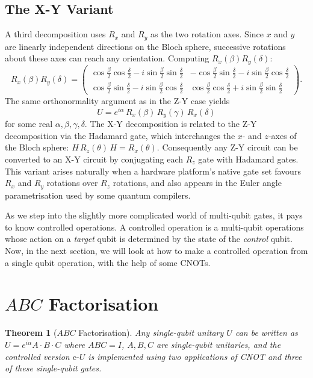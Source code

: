 \documentclass[12pt, a4paper, oneside]{report}
\theoremstyle{plain}
\newtheorem{theorem}{Theorem}[chapter]
\theoremstyle{definition}
\theoremstyle{remark}
\newcommand{\cU}{\mathrm{c}\text{-}U}
\newcommand{\Rx}{R_x}
\newcommand{\Ry}{R_y}
\newcommand{\Rz}{R_z}
\begin{document}
\subsection{The X-Y Variant}

A third decomposition uses $\Rx$ and $\Ry$ as the two rotation axes. Since $x$ and $y$ are
linearly independent directions on the Bloch sphere, successive rotations about these axes
can reach any orientation. Computing $\Rx(\beta)\Ry(\delta)$:
\[
	\Rx(\beta)\Ry(\delta)
	= \begin{pmatrix}
		\cos\frac{\beta}{2}\cos\frac{\delta}{2} - i\sin\frac{\beta}{2}\sin\frac{\delta}{2} &
		-\cos\frac{\beta}{2}\sin\frac{\delta}{2} - i\sin\frac{\beta}{2}\cos\frac{\delta}{2}  \\[4pt]
		\cos\frac{\beta}{2}\sin\frac{\delta}{2} - i\sin\frac{\beta}{2}\cos\frac{\delta}{2} &
		\cos\frac{\beta}{2}\cos\frac{\delta}{2} + i\sin\frac{\beta}{2}\sin\frac{\delta}{2}
	\end{pmatrix}.
\]
The same orthonormality argument as in the Z-Y case yields
\[
	U = e^{i\alpha}\,\Rx(\beta)\,\Ry(\gamma)\,\Rx(\delta)
\]
for some real $\alpha,\beta,\gamma,\delta$. The X-Y decomposition is related to the Z-Y
decomposition via the Hadamard gate, which interchanges the $x$- and $z$-axes of the Bloch
sphere: $H\,\Rz(\theta)\,H = \Rx(\theta)$. Consequently any Z-Y circuit can be converted to
an X-Y circuit by conjugating each $\Rz$ gate with Hadamard gates. This variant arises
naturally when a hardware platform's native gate set favours $\Rx$ and $\Ry$ rotations over
$\Rz$ rotations, and also appears in the Euler angle parametrisation used by some quantum
compilers.

As we step into the slightly more complicated world of multi-qubit gates, it pays to know controlled operations. A controlled operation is a multi-qubit operations whose action on a \emph{target} qubit is determined by the state of the \emph{control} qubit. Now, in the next section, we will look at how to make a controlled operation from a single qubit operation, with the help of some CNOTs.

\section{\texorpdfstring{$ABC$}{ABC} Factorisation}

\begin{theorem}[$ABC$ Factorisation]
	\label{thm:abc}
	Any single-qubit unitary $U$ can be written as $U = e^{i\alpha} A \cdot B \cdot C$ where
	$ABC = I$, $A, B, C$ are single-qubit unitaries, and the controlled version $\cU$ is
	implemented using two applications of CNOT and three of these single-qubit gates.
\end{theorem}
\end{document}
